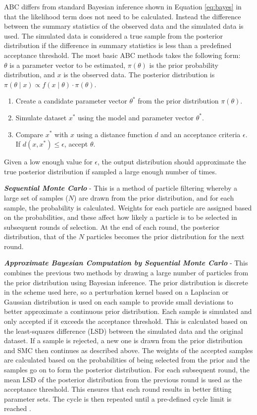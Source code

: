 ABC differs from standard Bayesian inference shown in Equation \ref{eq:bayes} in that the likelihood term does not need to be calculated. Instead the difference between the summary statistics of the observed data and the simulated data is used. The simulated data is considered a true sample from the posterior distribution if the difference in summary statistics is less than a predefined acceptance threshold.
The most basic ABC methods takes the following form:\\
$\theta$ is a parameter vector to be estimated, $\pi(\theta)$ is the prior probability distribution, and $x$ is the observed data. The posterior distribution is $\pi(\theta \mid x) \propto f(x \mid \theta)\cdot \pi(\theta)$.
\begin{enumerate}
	\item Create a candidate parameter vector $\theta^*$ from the prior distribution $\pi(\theta)$.
	\item Simulate dataset $x^*$ using the model and parameter vector $\theta^*$.
	\item Compare $x^*$ with $x$ using a distance function $d$ and an acceptance criteria $\epsilon$. If $d(x,x^*)\leq \epsilon$, accept $\theta$.
\end{enumerate}

Given a low enough value for $\epsilon$, the output distribution should approximate the true posterior distribution if sampled a large enough number of times.

\textbf{\textit{Sequential Monte Carlo}} - This is a method of particle filtering whereby a large set of samples ($N$) are drawn from the prior distribution, and for each sample, the probability is calculated. Weights for each particle are assigned based on the probabilities, and these affect how likely a particle is to be selected in subsequent rounds of selection. At the end of each round, the posterior distribution, that of the $N$ particles becomes the prior distribution for the next round.

\textbf{\textit{Approximate Bayesian Computation by Sequential Monte Carlo}} - This combines the previous two methods by drawing a large number of particles from the prior distribution using Bayesian inference. The prior distribution is discrete in the scheme used here, so a perturbation kernel based on a Laplacian or Gaussian distribution is used on each sample to provide small deviations to better approximate a continuous prior distribution. Each sample is simulated and only accepted if it exceeds the acceptance threshold. This is calculated based on the least-squares difference (LSD) between the simulated data and the original dataset. If a sample is rejected, a new one is drawn from the prior distribution and SMC then continues as described above. The weights of the accepted samples are calculated based on the probabilities of being selected from the prior and the samples go on to form the posterior distribution. For each subsequent round, the mean LSD of the posterior distribution from the previous round is used as the acceptance threshold. This ensures that each round results in better fitting parameter sets. The cycle is then repeated until a pre-defined cycle limit is reached \cite{Toni2009}.

